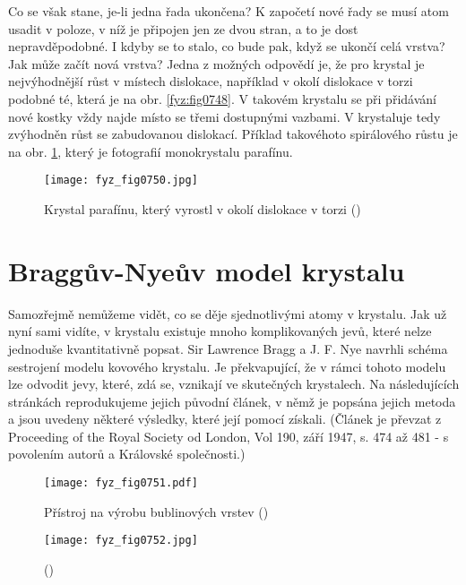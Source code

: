     Co se však stane, je-li jedna řada ukončena? K započetí nové řady se musí atom usadit v poloze, 
    v níž je připojen jen ze dvou stran, a to je dost nepravděpodobné. I kdyby se to stalo, co bude 
    pak, když se ukončí celá vrstva? Jak může začít nová vrstva? Jedna z možných odpovědí je, že 
    pro krystal je nejvýhodnější růst v místech dislokace, například v okolí dislokace v torzi 
    podobné té, která je na obr. \ref{fyz:fig0748}. V takovém krystalu se při přidávání nové kostky 
    vždy najde místo se třemi dostupnými vazbami. V krystaluje tedy zvýhodněn růst se zabudovanou 
    dislokací. Příklad takovéhoto spirálového růstu je na obr. \ref{fyz:fig0750}, který je 
    fotografií monokrystalu parafínu.
    
    \begin{figure}[ht!] %
      \centering
      \texttt{[image: fyz\_fig0750.jpg]}
      \caption{Krystal parafínu, který vyrostl v okolí dislokace v torzi
               (\cite[s.~555]{Feynman02})}
      \label{fyz:fig0750}
    \end{figure}

  \section{Braggův-Nyeův model krystalu}\label{fyz:IIchapXXXsecIX}
    Samozřejmě nemůžeme vidět, co se děje sjednotlivými atomy v krystalu. Jak už nyní sami vidíte, 
    v krystalu existuje mnoho komplikovaných jevů, které nelze jednoduše kvantitativně popsat. Sir 
    Lawrence Bragg a J. F. Nye navrhli schéma sestrojení modelu kovového krystalu. Je překvapující, 
    že v rámci tohoto modelu lze odvodit jevy, které, zdá se, vznikají ve skutečných krystalech. Na 
    následujících stránkách reprodukujeme jejich původní článek, v němž je popsána jejich metoda a 
    jsou uvedeny některé výsledky, které její pomocí získali. (Článek je převzat z Proceeding of 
    the Royal Society od London, Vol 190, září 1947, s. 474 až 481 - s povolením autorů a Královské 
    společnosti.)

    \begin{figure}[ht!] %
      \centering
      \texttt{[image: fyz\_fig0751.pdf]}
      \caption{Přístroj na výrobu bublinových vrstev
               (\cite[s.~557]{Feynman02})}
      \label{fyz:fig0751}
    \end{figure}

    \begin{figure}[ht!] %
      \centering
      \texttt{[image: fyz\_fig0752.jpg]}
      \caption{
               (\cite[s.~707]{Feynman02})}
      \label{fyz:fig0752}
    \end{figure}

